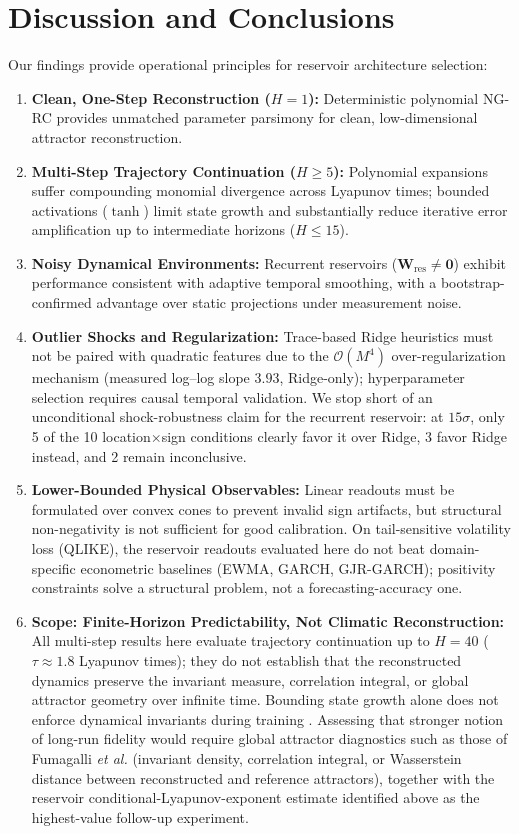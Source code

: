 \documentclass[aip,cha,reprint,amsmath,amssymb]{revtex4-2}
\begin{document}
\section{Discussion and Conclusions}
\label{sec:discussion}

Our findings provide operational principles for reservoir architecture selection:
\begin{enumerate}
    \item \textbf{Clean, One-Step Reconstruction ($H=1$):} Deterministic polynomial NG-RC provides unmatched parameter parsimony for clean, low-dimensional attractor reconstruction.
    \item \textbf{Multi-Step Trajectory Continuation ($H \ge 5$):} Polynomial expansions suffer compounding monomial divergence across Lyapunov times; bounded activations ($\tanh$) limit state growth and substantially reduce iterative error amplification up to intermediate horizons ($H \le 15$).
    \item \textbf{Noisy Dynamical Environments:} Recurrent reservoirs ($\mathbf{W}_{\text{res}} \neq \mathbf{0}$) exhibit performance consistent with adaptive temporal smoothing, with a bootstrap-confirmed advantage over static projections under measurement noise.
    \item \textbf{Outlier Shocks and Regularization:} Trace-based Ridge heuristics must not be paired with quadratic features due to the $\mathcal{O}(M^4)$ over-regularization mechanism (measured log--log slope $3.93$, Ridge-only); hyperparameter selection requires causal temporal validation. We stop short of an unconditional shock-robustness claim for the recurrent reservoir: at $15\sigma$, only 5 of the 10 location$\times$sign conditions clearly favor it over Ridge, 3 favor Ridge instead, and 2 remain inconclusive.
    \item \textbf{Lower-Bounded Physical Observables:} Linear readouts must be formulated over convex cones to prevent invalid sign artifacts, but structural non-negativity is not sufficient for good calibration. On tail-sensitive volatility loss (QLIKE), the reservoir readouts evaluated here do not beat domain-specific econometric baselines (EWMA, GARCH, GJR-GARCH); positivity constraints solve a structural problem, not a forecasting-accuracy one.
    \item \textbf{Scope: Finite-Horizon Predictability, Not Climatic Reconstruction:} All multi-step results here evaluate trajectory continuation up to $H=40$ ($\tau \approx 1.8$ Lyapunov times); they do not establish that the reconstructed dynamics preserve the invariant measure, correlation integral, or global attractor geometry over infinite time. Bounding state growth alone does not enforce dynamical invariants during training \cite{platt2023constraining}. Assessing that stronger notion of long-run fidelity would require global attractor diagnostics such as those of Fumagalli \emph{et al.} \cite{fumagalli2025datadriven} (invariant density, correlation integral, or Wasserstein distance between reconstructed and reference attractors), together with the reservoir conditional-Lyapunov-exponent estimate identified above as the highest-value follow-up experiment.

\end{enumerate}
\end{document}
